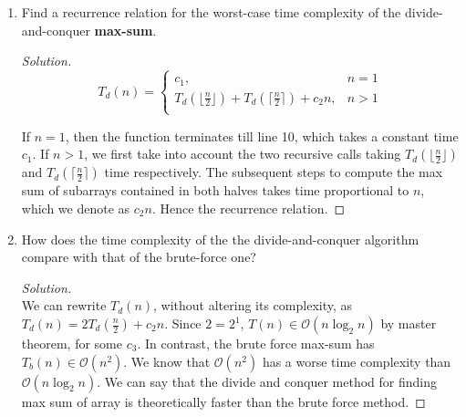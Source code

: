 \documentclass[11pt]{article}
\theoremstyle{plain}%
\theoremstyle{definition}
\theoremstyle{remark}
\newenvironment{solution}
  {\begin{proof}[Solution]}
  {\end{proof}}
\begin{document}
\begin{enumerate}
\begin{solution}
\begin{lstlisting}[language=Python]
          # find max sum of overlapping subarray starting from the middle
          leftStart = m - 1
          leftPartMaxSum = array[m - 1]
          while (leftStart >= 0):
              leftPartSum = sum(array[leftStart: m])
              if (leftPartSum > leftPartMaxSum):
                  leftPartMaxSum = leftPartSum
              leftStart -= 1

          rightEnd = m
          rightPartMaxSum = array[m]
          while (rightEnd <= n):
              rightPartSum = sum(array[m: rightEnd])
              if (rightPartSum > rightPartMaxSum):
                  rightPartMaxSum = rightPartSum
              rightEnd += 1


          return max(leftMaxSum, rightMaxSum, (leftPartMaxSum + rightPartMaxSum))
    \end{lstlisting}


  \end{solution}

  \item Find a recurrence relation for the worst-case time complexity of the divide-and-conquer \textbf {max-sum}.

  \begin{solution}
    $ $\\
    \begin{equation*}
      T_d(n) =
      \begin{cases}
        c_1, & n=1\\
        T_d(\lfloor \frac{n}{2}\rfloor) + T_d(\lceil \frac{n}{2} \rceil) + c_2n, & n>1\\
      \end{cases}
    \end{equation*}

    If $n=1$, then the function terminates till line 10, which takes a constant time $c_1$. If $n>1$, we first take into account the two recursive calls taking $  T_d(\lfloor \frac{n}{2}\rfloor)$ and $T_d(\lceil \frac{n}{2} \rceil)$ time respectively. The subsequent steps to compute the max sum of subarrays contained in both halves takes time proportional to $n$, which we denote as $c_2n$. Hence the recurrence relation.
  \end{solution}


  \item How does the time complexity of the the divide-and-conquer algorithm compare with that of the brute-force one?

  \begin{solution}
    $ $\\
    We can rewrite $T_d(n)$, without altering its complexity, as $T_d(n) = 2T_d(\frac{n}{2}) + c_2n$. Since $2 = 2^1$, $T(n)\in \mathcal{O}(n\log_{2}{n})$ by master theorem, for some $c_3$. In contrast, the brute force max-sum has $T_b(n) \in\mathcal{O}(n^2)$. We know that $\mathcal{O}(n^2)$ has a worse time complexity than $\mathcal{O}(n\log_{2}{n})$. We can say that the divide and conquer method for finding max sum of array is theoretically faster than the brute force method.
  \end{solution}


\end{enumerate}
\end{document}
